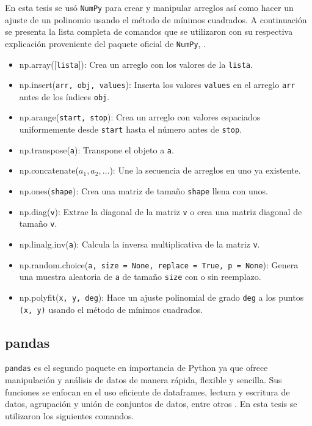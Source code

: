 En esta tesis se usó \texttt{NumPy} para crear y manipular arreglos así como hacer un ajuste de un polinomio usando el método de mínimos cuadrados. A continuación se presenta la lista completa de comandos que se utilizaron con su respectiva explicación proveniente del paquete oficial de \texttt{NumPy}, \cite{numpy_manual}. 

\begin{itemize}
	\item np.array([\texttt{lista}]): Crea un arreglo con los valores de la \texttt{lista}.
	
	\item np.insert(\texttt{arr, obj, values}): Inserta los valores \texttt{values} en el arreglo \texttt{arr} antes de los índices \texttt{obj}.
	
	\item np.arange(\texttt{start, stop}): Crea un arreglo con valores espaciados uniformemente desde \texttt{start} hasta el número antes de \texttt{stop}. 
	
	\item np.transpose(\texttt{a}): Transpone el objeto a \texttt{a}.
	
	\item np.concatenate($a_1, a_2, \dots $): Une la secuencia de arreglos en uno ya existente.
	
	\item np.ones(\texttt{shape}): Crea una matriz de tamaño \texttt{shape} llena con unos.
	
	\item np.diag(\texttt{v}): Extrae la diagonal de la matriz \texttt{v} o crea una matriz diagonal de tamaño \texttt{v}.
	
	\item np.linalg.inv(\texttt{a}): Calcula la inversa multiplicativa de la matriz \texttt{v}. 
	
	\item np.random.choice(\texttt{a, size = None, replace = True, p = None}): Genera una muestra aleatoria de \texttt{a} de tamaño \texttt{size} con o sin reemplazo. 
	
	\item np.polyfit(\texttt{x, y, deg}): Hace un ajuste polinomial de grado \texttt{deg} a los puntos \texttt{(x, y)} usando el método de mínimos cuadrados. 
	
\end{itemize}


\subsection{pandas}
\texttt{pandas} es el segundo paquete en importancia de \textsf{Python} ya que ofrece manipulación y análisis de datos de manera rápida, flexible y sencilla. Sus funciones se enfocan en el uso eficiente de dataframes, lectura y escritura de datos, agrupación y unión de conjuntos de datos, entre otros \cite{pandas_manual}. En esta tesis se utilizaron los siguientes comandos.

